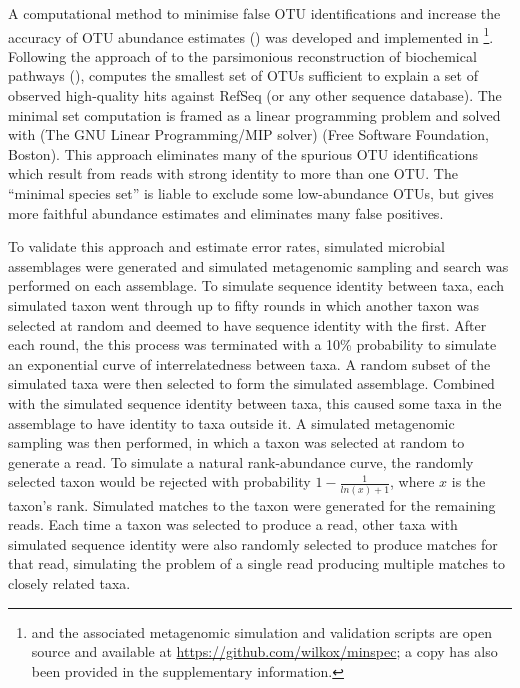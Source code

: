 A computational method to minimise false \ac{OTU} identifications and increase the accuracy of \ac{OTU} abundance estimates () was developed and implemented in \footnote{ and the associated metagenomic simulation and validation scripts are open source and available at \url{https://github.com/wilkox/minspec}; a copy has also been provided in the supplementary information.}.
Following the approach of \citet{Ye:2009bl} to the parsimonious reconstruction of biochemical pathways (),  computes the smallest set of \acp{OTU} sufficient to explain a set of observed high-quality hits against RefSeq (or any other sequence database).
The minimal set computation is framed as a linear programming problem and solved with  (The GNU Linear Programming/MIP solver) (Free Software Foundation, Boston).
This approach eliminates many of the spurious \ac{OTU} identifications which result from reads with strong identity to more than one \ac{OTU}. 
The ``minimal species set'' is liable to exclude some low-abundance \acp{OTU}, but gives more faithful abundance estimates and eliminates many false positives.

To validate this approach and estimate error rates, simulated microbial assemblages were generated and simulated metagenomic sampling and  search was performed on each assemblage.
To simulate sequence identity between taxa, each simulated taxon went through up to fifty rounds in which another taxon was selected at random and deemed to have sequence identity with the first.
After each round, the this process was terminated with a 10\% probability to simulate an exponential curve of interrelatedness between taxa.
A random subset of the simulated taxa were then selected to form the simulated assemblage.
Combined with the simulated sequence identity between taxa, this caused some taxa in the assemblage to have identity to taxa outside it.
A simulated metagenomic sampling was then performed, in which a taxon was selected at random to generate a read.
To simulate a natural rank-abundance curve, the randomly selected taxon would be rejected with probability $1 - \frac{1}{ln(x)+1}$, where $x$ is the taxon's rank.
Simulated  matches to the taxon were generated for the remaining reads.
Each time a taxon was selected to produce a read, other taxa with simulated sequence identity were also randomly selected to produce  matches for that read, simulating the problem of a single read producing multiple matches to closely related taxa.

